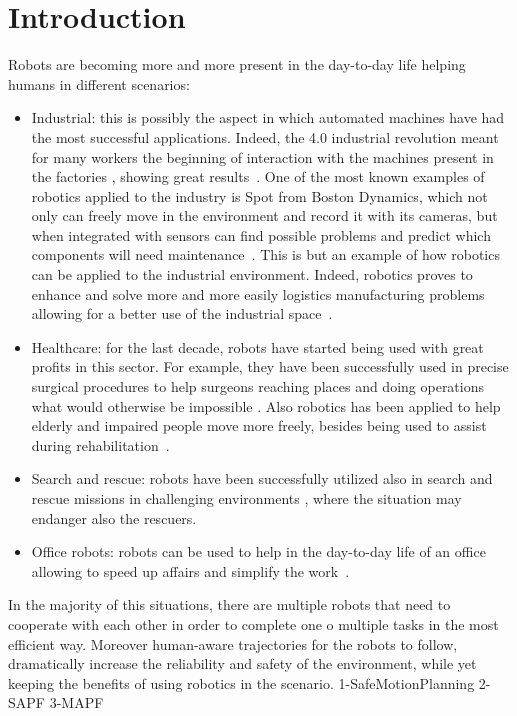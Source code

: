 \chapter{Introduction}
\label{ch:introduction}
Robots are becoming more and more present in the day-to-day life helping humans
in different scenarios:
\begin{itemize}
  \item Industrial: this is possibly the aspect in which automated
    machines have had the most successful applications. Indeed, the 4.0
    industrial revolution meant for many workers the beginning of interaction 
    with the machines present in the factories \cite{industry4_0}, showing great
    results~\cite{coordinationInWarehouse}. One of the most known examples of 
    robotics applied to the industry is Spot from Boston Dynamics, which not 
    only can freely move in the environment and record it with its cameras, but
    when integrated with sensors can find possible problems and predict which
    components will need maintenance~\cite{bostonDynamics}. This is but an
    example of how robotics can be applied to the industrial environment.
    Indeed, robotics proves to enhance and solve more and more easily logistics
    manufacturing problems allowing for a better use of the industrial
    space~\cite{industry4_0_1}.
  \item Healthcare: for the last decade, robots have started being used with
    great profits in this sector. For example, they have been successfully used
    in precise surgical procedures to help surgeons reaching places and doing
    operations what would otherwise be impossible \cite{surgicalRobot}. Also
    robotics has been applied to help elderly and impaired people move more
    freely, besides being used to assist during 
    rehabilitation~\cite{friWalker}.
  \item Search and rescue: robots have been successfully utilized also in
    search and rescue missions in challenging environments
    \cite{searchRescueDrones}, where the situation may endanger also the
    rescuers. 
  \item Office robots: robots can be used to help in the day-to-day life of an 
    office allowing to speed up affairs and simplify the work~\cite{cobots}.
\end{itemize}
In the majority of this situations, there are multiple robots that need to
cooperate with each other in order to complete one o multiple tasks in the most
efficient way. Moreover human-aware trajectories for the robots to follow, 
dramatically increase the reliability and safety of the environment, while yet
keeping the benefits of using robotics in the scenario. 
%
%
%
{1-SafeMotionPlanning}
{2-SAPF}
{3-MAPF}
